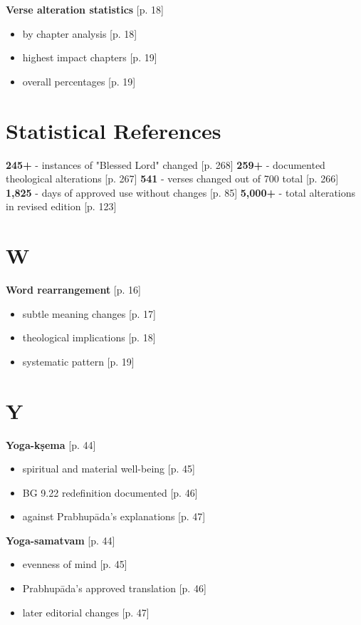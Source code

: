 \documentclass[11pt,twoside]{book}
\begin{document}
\textbf{\textbf{Verse alteration statistics}} {[}p. 18]
\begin{itemize}
\item by chapter analysis [p. 18]
\item highest impact chapters [p. 19]
\item overall percentages [p. 19]
\end{itemize}
\section*{Statistical References}
\label{sec:orgffe2ba4}

\textbf{\textbf{245+}} - instances of "Blessed Lord" changed [p. 268]
\textbf{\textbf{259+}} - documented theological alterations [p. 267]
\textbf{\textbf{541}} - verses changed out of 700 total [p. 266]
\textbf{\textbf{1,825}} - days of approved use without changes [p. 85]
\textbf{\textbf{5,000+}} - total alterations in revised edition [p. 123]
\section*{W}
\label{sec:org9b27f2d}

\textbf{\textbf{Word rearrangement}} {[}p. 16]
\begin{itemize}
\item subtle meaning changes [p. 17]
\item theological implications [p. 18]
\item systematic pattern [p. 19]
\end{itemize}
\section*{Y}
\label{sec:org4a05b27}

\textbf{\textbf{Yoga-kṣema}} {[}p. 44]
\begin{itemize}
\item spiritual and material well-being [p. 45]
\item BG 9.22 redefinition documented [p. 46]
\item against Prabhupāda's explanations [p. 47]
\end{itemize}

\textbf{\textbf{Yoga-samatvam}} {[}p. 44]
\begin{itemize}
\item evenness of mind [p. 45]
\item Prabhupāda's approved translation [p. 46]
\item later editorial changes [p. 47]
\end{itemize}
\end{document}
